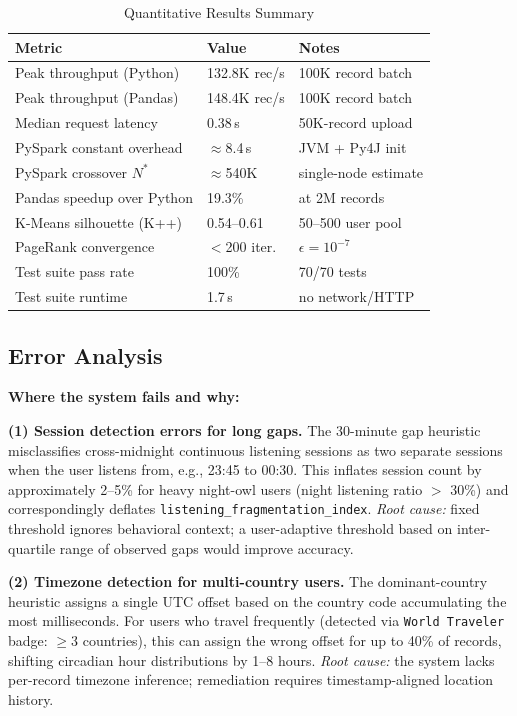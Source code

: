 \documentclass[conference]{IEEEtran}
\begin{document}
\begin{table}[ht]
\caption{Quantitative Results Summary}
\label{tab:results}
\centering
\renewcommand{\arraystretch}{1.15}
\begin{tabular}{lll}
\toprule
\textbf{Metric} & \textbf{Value} & \textbf{Notes} \\
\midrule
Peak throughput (Python)   & 132.8K rec/s  & 100K record batch \\
Peak throughput (Pandas)   & 148.4K rec/s  & 100K record batch \\
Median request latency     & 0.38\,s       & 50K-record upload \\
PySpark constant overhead  & $\approx$8.4\,s & JVM + Py4J init \\
PySpark crossover $N^*$    & $\approx$540K & single-node estimate \\
Pandas speedup over Python & 19.3\%        & at 2M records \\
K-Means silhouette (K++)   & 0.54–0.61     & 50–500 user pool \\
PageRank convergence       & $<$200 iter.  & $\epsilon = 10^{-7}$ \\
Test suite pass rate       & 100\%         & 70/70 tests \\
Test suite runtime         & 1.7\,s        & no network/HTTP \\
\bottomrule
\end{tabular}
\end{table}

\subsection{Error Analysis}

\textbf{Where the system fails and why:}

\textbf{(1) Session detection errors for long gaps.}
The 30-minute gap heuristic misclassifies cross-midnight continuous
listening sessions as two separate sessions when the user listens from,
e.g., 23:45 to 00:30. This inflates session count by approximately 2–5\%
for heavy night-owl users (night listening ratio $>$ 30\%) and
correspondingly deflates \texttt{listening\_fragmentation\_index}.
\textit{Root cause:} fixed threshold ignores behavioral context;
a user-adaptive threshold based on inter-quartile range of observed
gaps would improve accuracy.

\textbf{(2) Timezone detection for multi-country users.}
The dominant-country heuristic assigns a single UTC offset based on
the country code accumulating the most milliseconds. For users who
travel frequently (detected via \texttt{World Traveler} badge:
$\geq$3 countries), this can assign the wrong offset for up to 40\% of
records, shifting circadian hour distributions by 1–8 hours.
\textit{Root cause:} the system lacks per-record timezone inference;
remediation requires timestamp-aligned location history.
\end{document}
